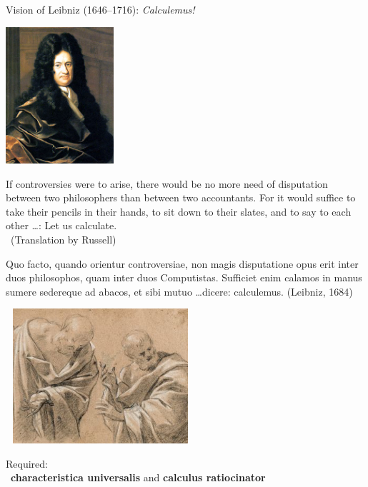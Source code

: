 \documentclass[9pt,mathserif,unknownkeysallowed,xcolor=dvipsnames]{beamer}
\newenvironment{changemargin}[2]{%
  \begin{list}{}{%
    \setlength{\topsep}{0pt}%
    \setlength{\leftmargin}{#1}%
    \setlength{\rightmargin}{#2}%
    \setlength{\listparindent}{\parindent}%
    \setlength{\itemindent}{\parindent}%
    \setlength{\parsep}{\parskip}%
  }%
\item[]
}{\end{list}}
\begin{document}
\begin{frame}{Vision of Leibniz (1646--1716): \textit{Calculemus!}}
\begin{changemargin}{-.5cm}{-.5cm}
\begin{minipage}{4cm}
\includegraphics[width=4cm]{./Images/Varia/Leibniz.png} 

\vspace*{1em}
\color{gray}\footnotesize
If controversies were to arise, there would be no more need of
disputation between two philosophers than between two
accountants. For it would suffice to take their pencils in their
hands, to sit down to their slates, and to say to each other \ldots :
Let us calculate. \\ \phantom{bla} \, \hfill (Translation by Russell)
\end{minipage} \hfill
\begin{minipage}{7cm} \small
Quo facto, quando orientur controversiae, non magis disputatione opus erit inter
duos philosophos, quam inter duos Computistas. Sufficiet enim calamos in
manus sumere sedereque ad abacos, et sibi mutuo \ldots dicere: calculemus.
\hfill (Leibniz, 1684)
\vspace*{1em}

\includegraphics[width=7cm,height=5cm]{./Images/Varia/Dispute1.jpg}

\vspace*{1em}
Required: \\
\, \hfil \textbf{characteristica universalis} and  \textbf{calculus ratiocinator}
\end{minipage}
\end{changemargin}
\end{frame}
\end{document}
